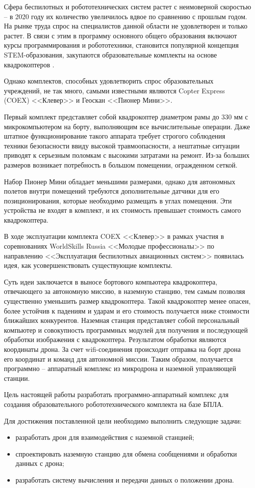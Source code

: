 Сфера беспилотных и робототехнических систем растет с неимоверной скоростью -- в 2020 году их количество увеличилось вдвое по сравнению с прошлым годом. На рынке труда спрос на специалистов данной области не удовлетворен и только растет. В связи с этим в программу основного общего образования включают курсы программирования и робототехники, становится популярной концепция STEM-образования, закупаются образовательные комплекты на основе квадрокоптеров \cite{minobr}.

Однако комплектов, способных удовлетворить спрос образовательных учреждений, не так много, самыми известными являются Copter Express (COEX) <<Клевер>> и Геоскан <<Пионер Мини>>.

Первый комплект представляет собой квадрокоптер диаметром рамы до 330 мм с микрокомпьютером на борту, выполняющим все вычислительные операции. Даже штатное функционирование такого аппарата требует строгого соблюдения техники безопасности ввиду высокой травмоопасности, а нештатные ситуации приводят к серьезным поломкам с высокими затратами на ремонт. Из-за больших размеров возникает потребность в большом помещении, огражденном сеткой.

Набор Пионер Мини обладает меньшими размерами, однако для автономных полетов внутри помещений требуются дополнительные датчики для его позиционирования, которые необходимо размещать в углах помещения. Эти устройства не входят в комплект, и их стоимость превышает стоимость самого квадрокоптера.

В ходе эксплуатации комплекта COEX <<Клевер>> в рамках участия в соревнованиях WorldSkills Russia <<Молодые профессионалы>> по направлению <<Эксплуатация беспилотных авиационных систем>> появилась идея, как усовершенствовать существующие комплекты.

Суть идеи заключается в выносе бортового компьютера квадрокоптера, отвечающего за автономную миссию, в наземную станцию, тем самым позволяя существенно уменьшить размер квадрокоптера. Такой квадрокоптер менее опасен, более устойчив к падениям и ударам и его стоимость получается ниже стоимости ближайших конкурентов. Наземная станция представляет собой персональный компьютер и совокупность программных модулей для получения и последующей обработки изображения с квадрокоптера. Результатом обработки являются координаты дрона. За счет wifi-соединения происходит отправка на борт дрона его координат и команд для автономной миссии. Таким образом, получается программно -- аппаратный комплекс из микродрона и наземной управляющей станции.

Цель настоящей работы разработать программно-аппаратный комплекс для создания образовательного робототехнического комплекта на базе БПЛА.

Для достижения поставленной цели необходимо выполнить следующие задачи:
\begin{itemize}
	\item разработать дрон для взаимодействия с наземной станцией;
	\item спроектировать наземную станцию для обмена сообщениями и обработки данных с дрона;
	\item разработать систему вычисления и передачи данных о положении дрона. 
\end{itemize}